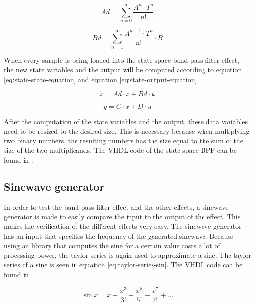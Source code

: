 \begin{equation}
    Ad=\sum_{n=0}^{\infty}\frac{A^n\cdot T^n}{n!}
    \label{eq:taylor-series-Ad}
\end{equation}

\begin{equation}
    Bd=\sum_{n=1}^{\infty}\frac{A^{n-1}\cdot T^n}{n!}\cdot B
    \label{eq:taylor-series-Bd}
\end{equation}

When every sample is being loaded into the state-space band-pass filter effect, the new state variables and the output will be computed according to equation \ref{eq:state-state-equation} and equation \ref{eq:state-output-equation}. 

\begin{equation}
    \dot{x}=Ad \cdot x + Bd \cdot u
    \label{eq:state-state-equation}
\end{equation}

\begin{equation}
    y=C \cdot x + D \cdot u
    \label{eq:state-output-equation}
\end{equation}

After the computation of the state variables and the output, these data variables need to be resized to the desired size. This is necessary because when multiplying two binary numbers, the resulting numbers has the size equal to the sum of the size of the two multiplicands. The VHDL code of the state-space BPF can be found in . 

\subsection{Sinewave generator}
In order to test the band-pass filter effect and the other effects, a sinewave generator is made to easily compare the input to the output of the effect. This makes the verification of the different effects very easy. The sinewave generator has an input that specifies the frequency of the generated sinewave. Because using an library that computes the sine for a certain value costs a lot of processing power, the taylor series is again used to approximate a sine. The taylor series of a sine is seen in equation \ref{eq:taylor-series-sin}. The VHDL code can be found in . 

\begin{equation}
    \sin x = x - \frac{x^3}{3!} + \frac{x^5}{5!} - \frac{x^7}{7!} + \dots
    \label{eq:taylor-series-sin}
\end{equation}

